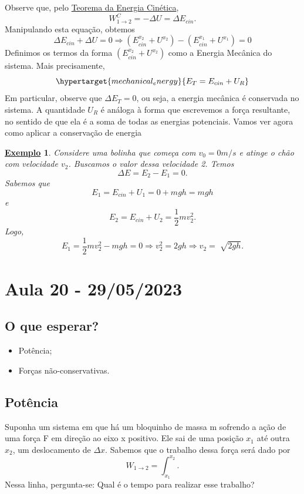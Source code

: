 \documentclass{article}
\newtheorem{example}{\underline{Exemplo}}
\begin{document}
      Observe que, pelo \hyperlink{work_kin_3d}{Teorema da Energia Cinética}, 
        \[
          W_{1\rightarrow2}^{C} = -\Delta U = \Delta E_{cin}.
        \]
      Manipulando esta equa\c cão, obtemos 
        \[
          \Delta E_{cin} + \Delta U = 0 \Rightarrow (E_{cin}^{x_2} + U^{x_2}) - (E_{cin}^{x_1} + U^{x_1}) = 0
        \]
        Definimos os termos da forma \((E_{cin}^{x_2} + U^{x_2})\) como a Energia Mecânica do sistema. Mais precisamente, 
        \[
          \hypertarget{mechanical_energy}{E_{T} = E_{cin} + U_{R}}
        \] 
        Em particular, observe que \(\Delta E_{T} = 0\), ou seja, a energia
        mecânica é conservada no sistema. A quantidade \(U_{R}\) é análoga à 
        forma que escrevemos a for\c ca resultante, no sentido de que ela é a soma
        de todas as energias potenciais. Vamos ver agora como aplicar a conserva\c cão de energia
       \begin{example}
         Considere uma bolinha que come\c ca com \(v_{0} = 0m/s\) e atinge o chão com velocidade
         \(v_{2}\). Buscamos o valor dessa velocidade 2. Temos 
           \[
             \Delta E = E_{2} - E_{1} = 0.
           \]
          Sabemos que 
            \[
              E_{1} = E_{cin} + U_{1} = 0 + mgh = mgh
            \]
          e 
            \[
              E_{2} = E_{cin} + U_{2} = \frac{1}{2}mv_{2}^{2}.
            \]
          Logo, 
            \[
              E_{1} = \frac{1}{2}mv_{2}^{2} - mgh = 0 \Rightarrow v_{2}^{2} = 2gh \Rightarrow v_{2} = \sqrt[]{2gh}.
            \]
       \end{example}
\newpage

\section{Aula 20 - 29/05/2023}
\subsection{O que esperar?}
\begin{itemize}
  \item Potência;
  \item For\c cas não-conservativas.
\end{itemize}
\subsection{Potência}
  Suponha um sistema em que há um bloquinho de massa m sofrendo a a\c cão de uma for\c ca F
  em dire\c cão ao eixo x positivo. Ele sai de uma posi\c cão \(x_{1}\) até outra
  \(x_{2}\), um deslocamento de \(\Delta x\). Sabemos que o trabalho dessa for\c ca será 
  dado por 
    \[
      W_{1\rightarrow2} = \int_{x_{1}}^{x_{2}}.
    \]
    Nessa linha, pergunta-se: Qual é o tempo para realizar esse trabalho?
  
\end{document}
